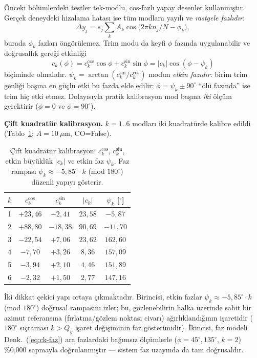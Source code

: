 \documentclass[preprint,12pt]{elsarticle}
\begin{document}
Önceki bölümlerdeki testler tek-modlu, cos-fazlı yapay desenler
kullanmıştır. Gerçek deneydeki hizalama hatası ise tüm modlara yayılı ve
\emph{rastgele fazlıdır}:
\begin{equation}
\Delta y_j = s_j \sum_k A_k \cos\!\big(2\pi k n_j/N - \phi_k\big),
\end{equation}
burada $\phi_k$ fazları öngörülemez. Trim modu da keyfi $\phi$ fazında
uygulanabilir ve doğrusallık gereği etkinliği
\begin{equation}
c_k(\phi) = c_k^{\cos}\cos\phi + c_k^{\sin}\sin\phi
          = |c_k|\cos(\phi - \psi_k)
\label{eq:ck-faz}
\end{equation}
biçiminde olmalıdır. $\psi_k=\arctan(c_k^{\sin}/c_k^{\cos})$ modun
\emph{etkin fazıdır}: birim trim genliği başına en güçlü etki bu fazda
elde edilir; $\phi=\psi_k\pm90^\circ$ ``ölü fazında'' ise trim hiç etki
etmez. Dolayısıyla pratik kalibrasyon mod başına \emph{iki} ölçüm
gerektirir ($\phi=0$ ve $\phi=90^\circ$).

\textbf{Çift kuadratür kalibrasyon.}
$k=1..6$ modları iki kuadratürde kalibre edildi
(Tablo~\ref{tab:ck-quad}; $A=10~\mu$m, CO=False).

\begin{table}[h]
\centering
\caption{Çift kuadratür kalibrasyon: $c_k^{\cos}$, $c_k^{\sin}$, etkin
büyüklük $|c_k|$ ve etkin faz $\psi_k$. Faz rampası
$\psi_k\approx-5{,}85^\circ\!\cdot\!k$ (mod $180^\circ$) düzenli yapıyı
gösterir.}
\label{tab:ck-quad}
\begin{tabular}{ccccc}
\toprule
$k$ & $c_k^{\cos}$ & $c_k^{\sin}$ & $|c_k|$ & $\psi_k$ [$^\circ$] \\
\midrule
1 & $+23{,}46$ & $-2{,}41$  & $23{,}58$ & $-5{,}87$  \\
2 & $+88{,}80$ & $-18{,}38$ & $90{,}69$ & $-11{,}70$ \\
3 & $-22{,}54$ & $+7{,}06$  & $23{,}62$ & $162{,}60$ \\
4 & $-7{,}70$  & $+3{,}26$  & $8{,}36$  & $157{,}09$ \\
5 & $-3{,}94$  & $+2{,}10$  & $4{,}46$  & $151{,}89$ \\
6 & $-2{,}32$  & $+1{,}50$  & $2{,}77$  & $147{,}16$ \\
\bottomrule
\end{tabular}
\end{table}

İki dikkat çekici yapı ortaya çıkmaktadır. Birincisi, etkin fazlar
$\psi_k \approx -5{,}85^\circ\cdot k$ (mod $180^\circ$) doğrusal
rampasını izler; bu, gözlenebilirin halka üzerinde sabit bir azimut
referansına (fırlatma/gözlem noktası civarı) ağırlıklandığının
işaretidir ($180^\circ$ sıçraması $k>Q_y$ işaret değişiminin faz
gösterimidir). İkincisi, faz modeli Denk.~(\ref{eq:ck-faz}) ara
fazlardaki bağımsız ölçümlerle ($\phi=45^\circ,135^\circ$, $k=2$)
\%0{,}000 sapmayla doğrulanmıştır — sistem faz uzayında da tam
doğrusaldır.
\end{document}
